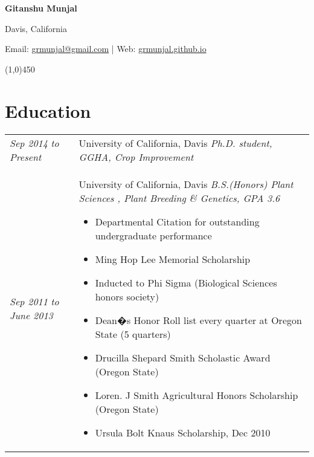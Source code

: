 \documentclass[a4paper]{article}
\def\name{Gitanshu Munjal}
\begin{document}
\centerline{\huge \bf \name}
\vspace{0.07in}
\centerline{Davis, California}
\centerline{Email: \href{mailto:grmunjal@gmail.com}{grmunjal@gmail.com}  |  Web: \href{http://grmunjal.github.io/}{grmunjal.github.io}}

\begin{center}
\line(1,0){450}
\end{center}


\section*{Education}
\begin{tabular}{p{3cm} p{14cm}}
\vspace{0pt} 
\textit{Sep 2014}\newline
\textit{to}\newline
\textit{Present}\newline
& 
\vspace{0pt}
{\Large University of California, Davis}\newline
\textit{Ph.D. student, GGHA, Crop Improvement}
%
\\
%
\vspace{0pt} 
\textit{Sep 2011}\newline
\textit{to}\newline
\textit{June 2013}\newline
& 
\vspace{0pt}
{\Large University of California, Davis}\newline
\textit{B.S.(Honors) Plant Sciences , Plant Breeding \& Genetics, GPA 3.6}
\begin{itemize}[noitemsep,topsep=0pt]
  \item Departmental Citation for outstanding undergraduate performance
  \item Ming Hop Lee Memorial Scholarship
  \item Inducted to Phi Sigma (Biological Sciences honors society)
  \item Dean�s Honor Roll list every quarter at Oregon State (5 quarters)
  \item Drucilla Shepard Smith Scholastic Award (Oregon State)
  \item Loren. J Smith Agricultural Honors Scholarship (Oregon State)
  \item Ursula Bolt Knaus Scholarship, Dec 2010
\end{itemize}
\end{tabular}
\end{document}
